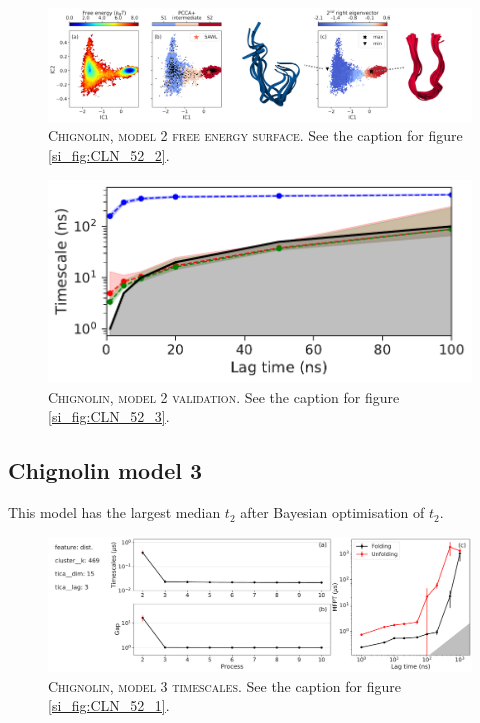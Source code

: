 \documentclass{article}
\begin{document}
\begin{figure}[h]
    \centering
    \includegraphics[width=\columnwidth]{SI_figures/CLN_23_SI2.png}
    \caption{\textsc{Chignolin,  model 2 free energy surface}. See the caption for figure \ref{si_fig:CLN_52_2}.}
    \label{si_fig:CLN_24_2}
\end{figure}

\begin{figure}[h]
    \centering
    \includegraphics[height=0.15\textheight]{SI_figures/CLN_23_its.pdf}
    \caption{\textsc{Chignolin, model 2 validation}. See the caption for figure \ref{si_fig:CLN_52_3}.}
    \label{si_fig:CLN_24_3}
\end{figure}

\FloatBarrier
\clearpage

\subsection{Chignolin model 3}

This model has the largest median $t_{2}$ after Bayesian optimisation of $t_{2}$.

\begin{figure}[h]
    \centering
    \includegraphics[width=\columnwidth]{SI_figures/CLN_218_SI-1.pdf}
    \caption{\textsc{Chignolin,  model 3 timescales}.  See the caption for figure \ref{si_fig:CLN_52_1}. }
    \label{si_fig:CLN_218_1}
\end{figure}
\end{document}
